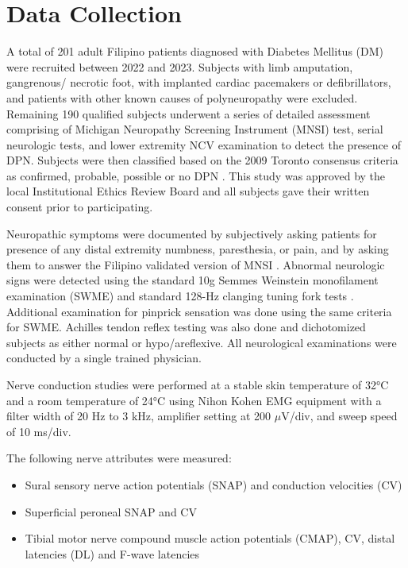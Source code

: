 \documentclass[pdflatex,sn-vancouver-num]{sn-jnl}
\begin{document}
\section{Data Collection}
A total of 201 adult Filipino patients diagnosed with Diabetes Mellitus (DM) were recruited
between 2022 and 2023. Subjects with limb amputation, gangrenous/ necrotic foot, with implanted
cardiac pacemakers or defibrillators, and patients with other known causes of polyneuropathy were
excluded. Remaining 190 qualified subjects underwent a series of detailed assessment comprising of
Michigan Neuropathy Screening Instrument (MNSI) test, serial neurologic tests, and lower extremity NCV
examination to detect the presence of DPN. Subjects were then classified based on the 2009 Toronto
consensus criteria as confirmed, probable, possible or no DPN \cite{tesfaye2010diabetic}. This study was approved by the local Institutional Ethics Review Board and all subjects gave their written consent prior to participating.

Neuropathic symptoms were documented by subjectively asking patients for presence of any
distal extremity numbness, paresthesia, or pain, and by asking them to answer the Filipino validated
version of MNSI \cite{dagang2016validation}. Abnormal neurologic signs were detected using the standard 10g Semmes Weinstein monofilament examination (SWME) and standard 128-Hz clanging tuning fork tests \cite{feng2009semmes,oyer2007quantitative}. Additional examination for pinprick sensation was done using the same criteria for SWME. Achilles tendon reflex testing was also done and dichotomized subjects as either normal or hypo/areflexive. All neurological examinations were conducted by a single trained physician.

Nerve conduction studies were performed at a stable skin temperature of 32°C and a room
temperature of 24°C using Nihon Kohen EMG equipment with a filter width of 20 Hz to 3 kHz, amplifier
setting at 200 $\mu$V/div, and sweep speed of 10 ms/div. 

The following nerve attributes were measured: 
\begin{itemize}
\itemsep0em 
\item Sural sensory nerve action potentials (SNAP) and conduction velocities (CV)
\item Superficial peroneal SNAP and CV
\item Tibial motor nerve compound muscle action potentials (CMAP), CV, distal latencies (DL) and
F-wave latencies
\end{itemize}
\end{document}
